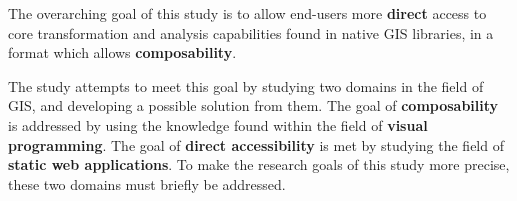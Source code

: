 
The overarching goal of this study is to allow end-users more \textbf{direct} access to core transformation and analysis capabilities found in native \ac{GIS} libraries, in a format which allows \textbf{composability}.

The study attempts to meet this goal by studying two domains in the field of \ac{GIS}, and developing a possible solution from them.
The goal of \textbf{composability} is addressed by using the knowledge found within the field of \textbf{visual programming}.
The goal of \textbf{direct accessibility} is met by studying the field of \textbf{static web applications}.  
To make the research goals of this study more precise, these two domains must briefly be addressed.


  





  

